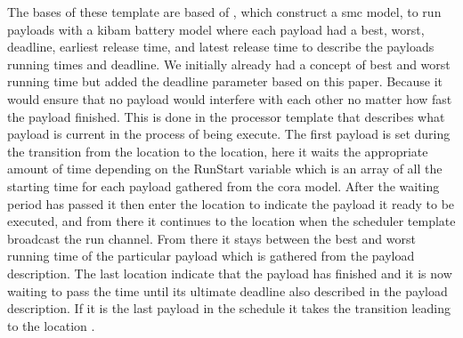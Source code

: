 The bases of these template are based of \cite{battery_aware_scheduling}, which construct a \gls{smc} model, to run payloads with a \gls{kibam} battery model where each payload had a best, worst, deadline, earliest release time, and latest release time to describe the payloads running times and deadline. We initially already had a concept of best and worst running time but added the deadline parameter based on this paper. Because it would ensure that no payload would interfere with each other no matter how fast the payload finished. This is done in the processor template that describes what payload is current in the process of being execute. The first payload is set during the transition from the  location to the  location, here it waits the appropriate amount of time depending on the RunStart variable which is an array of all the starting time for each payload gathered from the \gls{cora} model. After the waiting period has passed it then enter the  location to indicate the payload it ready to be executed, and from there it continues to the  location when the scheduler template broadcast the run channel. From there it stays between the best and worst running time of the particular payload which is gathered from the payload description. The last location  indicate that the payload has finished and it is now waiting to pass the time until its ultimate deadline also described in the payload description. If it is the last payload in the schedule it takes the transition leading to the location .





